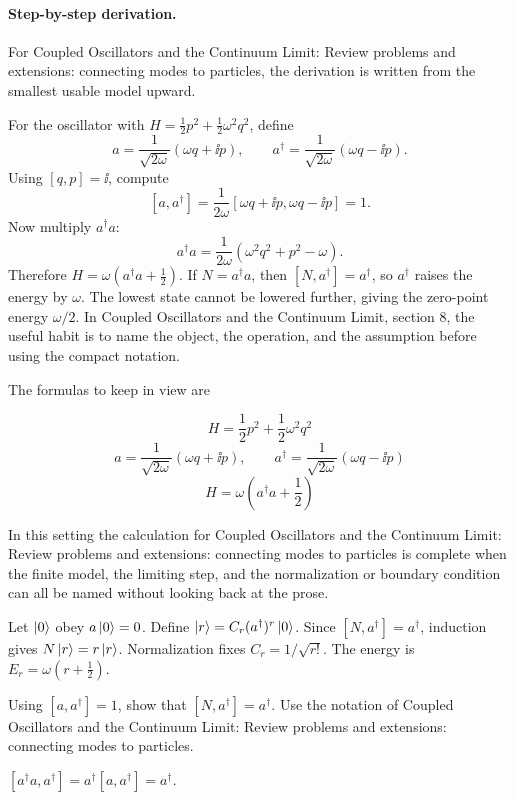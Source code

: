 \paragraph{Step-by-step derivation.}

For Coupled Oscillators and the Continuum Limit: Review problems and extensions: connecting modes to particles, the derivation is written from the smallest usable model upward.

For the oscillator with \(H=\frac12p^2+\frac12\omega^2q^2\), define
\[
  a=\frac{1}{\sqrt{2\omega}}(\omega q+\ii p),\qquad
  a^\dagger=\frac{1}{\sqrt{2\omega}}(\omega q-\ii p).
\]
Using \([q,p]=\ii\), compute
\[
  [a,a^\dagger]
  =
  \frac{1}{2\omega}[\omega q+\ii p,\omega q-\ii p]=1.
\]
Now multiply \(a^\dagger a\):
\[
  a^\dagger a=\frac{1}{2\omega}(\omega^2q^2+p^2-\omega).
\]
Therefore \(H=\omega(a^\dagger a+\frac12)\).  If \(N=a^\dagger a\), then \([N,a^\dagger]=a^\dagger\), so \(a^\dagger\) raises the energy by \(\omega\).  The lowest state cannot be lowered further, giving the zero-point energy \(\omega/2\).  In Coupled Oscillators and the Continuum Limit, section 8, the useful habit is to name the object, the operation, and the assumption before using the compact notation.

The formulas to keep in view are

\[
  H=\frac12p^2+\frac12\omega^2q^2
\]
\[
  a=\frac{1}{\sqrt{2\omega}}(\omega q+\ii p),\qquad a^\dagger=\frac{1}{\sqrt{2\omega}}(\omega q-\ii p)
\]
\[
  H=\omega\left(a^\dagger a+\frac12\right)
\]

In this setting the calculation for Coupled Oscillators and the Continuum Limit: Review problems and extensions: connecting modes to particles is complete when the finite model, the limiting step, and the normalization or boundary condition can all be named without looking back at the prose.




\begin{example}
Let \(\left|0\right\rangle\) obey \(a\left|0\right\rangle=0\).  Define \(\left|r\right\rangle=C_r(a^\dagger)^r\left|0\right\rangle\).  Since \([N,a^\dagger]=a^\dagger\), induction gives \(N\left|r\right\rangle=r\left|r\right\rangle\).  Normalization fixes \(C_r=1/\sqrt{r!}\).  The energy is \(E_r=\omega(r+\frac12)\).
\end{example}



\begin{exercise}
Using \([a,a^\dagger]=1\), show that \([N,a^\dagger]=a^\dagger\).  Use the notation of Coupled Oscillators and the Continuum Limit: Review problems and extensions: connecting modes to particles.
\begin{answer}
\([a^\dagger a,a^\dagger]=a^\dagger[a,a^\dagger]=a^\dagger\).
\end{answer}
\end{exercise}

